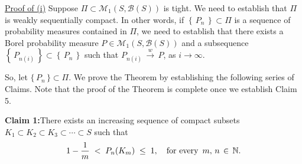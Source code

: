 \renewcommand{\theenumi}{\alph{enumi}}
\renewcommand{\labelenumi}{\textnormal{(\theenumi)}$\;\;$}

\vskip 0.3cm
\noindent
\underline{Proof of (i)}
\vskip 0.2cm
\noindent
Suppose $\Pi \subset \mathcal{M}_{1}(S,\mathcal{B}(S))$ is tight.
We need to establish that $\Pi$ is weakly sequentially compact.
In other words, if $\left\{\,P_{n}\,\right\} \subset \Pi$ is a sequence of probability measures contained in $\Pi$,
we need to establish that there exists a Borel probability measure
$P \in \mathcal{M}_{1}(S,\mathcal{B}(S))$ and a subsequence
$\left\{\,P_{n(i)}\,\right\} \subset \left\{\,P_{n}\,\right\}$
such that $P_{n(i)}\,\overset{w}{\longrightarrow}\,P$, as $i \longrightarrow \infty$.

\vskip 0.5cm
\noindent
So, let $\{\,P_{n}\,\} \subset \Pi$.
We prove the Theorem by establishing the following series of Claims.
Note that the proof of the Theorem is complete once we establish Claim 5.

\vskip 0.5cm
\begin{center}
\begin{minipage}{6.5in}
\textbf{Claim 1:}\quad There exists an increasing sequence of compact subsets
$K_{1} \subset K_{2} \subset K_{3} \subset \cdots \subset S$ such that
\begin{equation*}
1 - \dfrac{1}{m} \; < \; P_{n}(K_{m}) \; \leq \; 1,
\quad
\textnormal{for every \,$m, \,n \,\in\, \mathbb{N}$}.
\end{equation*}
\end{minipage}
\end{center}

